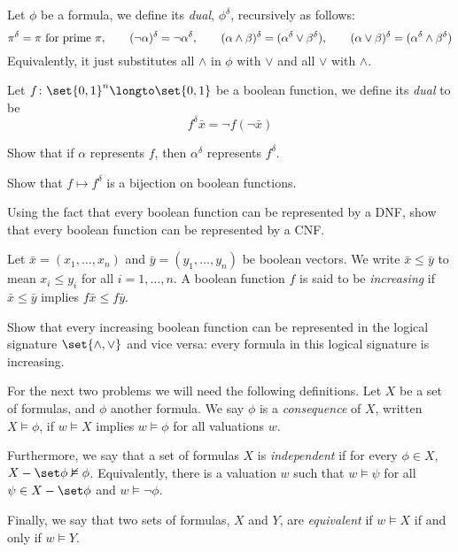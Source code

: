 \bprob

    Let $\phi$ be a formula, we define its {\it dual}, $\phi^\delta$, recursively as follows:
    $$ \pi^\delta = \pi \hbox{ for prime $\pi$},\qquad (\neg\alpha)^\delta=\neg\alpha^\delta,
    \qquad (\alpha\land\beta)^\delta = (\alpha^\delta\lor\beta^\delta),\qquad
    (\alpha\lor\beta)^\delta = (\alpha^\delta\land\beta^\delta) $$
    Equivalently, it just substitutes all $\land$ in $\phi$ with $\lor$ and all $\lor$ with
    $\land$.

    Let $f\colon\set{0,1}^n\longto\set{0,1}$ be a boolean function, we define its {\it dual} to be
    $$ f^\delta\bar x = \neg f(\neg\bar x) $$

    \benum
        \item Show that if $\alpha$ represents $f$, then $\alpha^\delta$ represents $f^\delta$.
        \item Show that $f\mapsto f^\delta$ is a bijection on boolean functions.
        \item Using the fact that every boolean function can be represented by a DNF, show that
        every boolean function can be represented by a CNF.
    \eenum

\eprob

\bprob

    Let $\bar x=(x_1,\dots,x_n)$ and $\bar y=(y_1,\dots,y_n)$ be boolean vectors.
    We write $\bar x\leq\bar y$ to mean $x_i\leq y_i$ for all $i=1,\dots,n$.
    A boolean function $f$ is said to be {\it increasing} if $\bar x\leq\bar y$ implies
    $f\bar x\leq f\bar y$.

    Show that every increasing boolean function can be represented in the logical signature
    $\set{{\land},{\lor}}$ and vice versa: every formula in this logical signature is increasing.

\eprob

For the next two problems we will need the following definitions.
Let $X$ be a set of formulas, and $\phi$ another formula.
We say $\phi$ is a {\it consequence} of $X$, written $X\vDash\phi$, if $w\vDash X$ implies
$w\vDash\phi$ for all valuations $w$.

Furthermore, we say that a set of formulas $X$ is {\it independent} if for every $\phi\in X$,
$X-\set\phi\nvDash\phi$.
Equivalently, there is a valuation $w$ such that $w\vDash\psi$ for all $\psi\in X-\set\phi$ and
$w\vDash\neg\phi$.

Finally, we say that two sets of formulas, $X$ and $Y$, are {\it equivalent} if $w\vDash X$ if
and only if $w\vDash Y$.

